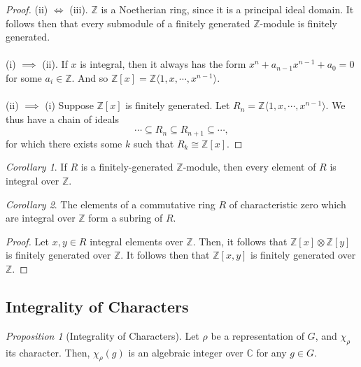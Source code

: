 \documentclass[a4paper]{report}
\theoremstyle{definition}
\theoremstyle{remark}
\theoremstyle{proposition}
\newtheorem{proposition}{Proposition}
\theoremstyle{conjecture}
\theoremstyle{lemma}
\theoremstyle{corollary}
\newtheorem{corollary}{Corollary}
\theoremstyle{exercise}
\theoremstyle{example}
\newcommand{\C}{\mathbb{C}}
\begin{document}
\begin{proof}
    (ii) $\Longleftrightarrow$ (iii). $\mathbb{Z}$ is a Noetherian ring, since
    it is a principal ideal domain.
    It follows then that every submodule of a finitely generated 
    $\mathbb{Z}$-module is finitely generated.\\\\
    (i) $\implies$ (ii). If $x$ is integral, then it always has the form
    $x^n + a_{n-1}x^{n-1} + a_0 = 0$
    for some $a_i \in \mathbb{Z}$. And so $\mathbb{Z}[x] = \mathbb{Z}\langle 1,x,\cdots,x^{n-1}\rangle$.\\\\
    (ii) $\implies$ (i) Suppose $\mathbb{Z}[x]$ is finitely generated. 
    Let $R_n = \mathbb{Z}\langle 1,x,\cdots,x^{n-1}\rangle$. 
    We thus have a chain of ideals 
    $$\cdots\subseteq R_n \subseteq R_{n+1}\subseteq \cdots,$$
    for which there exists some $k$ such that 
    $R_k \cong \mathbb{Z}[x]$.
\end{proof}

\begin{corollary}\label{cor_cor10}
    If $R$ is a finitely-generated $\mathbb{Z}$-module, then every element of 
    $R$ is integral over $\mathbb{Z}$.
\end{corollary}

\begin{corollary}
    The elements of a commutative ring $R$ of characteristic zero which 
    are integral over $\mathbb{Z}$ form a subring of $R$.
\end{corollary}

\begin{proof}
    Let $x,y\in R$ integral elements over $\mathbb{Z}$. Then, it follows
    that $\mathbb{Z}[x]\otimes \mathbb{Z}[y]$ is finitely generated over 
    $\mathbb{Z}$. It follows then that $\mathbb{Z}[x,y]$ is finitely 
    generated over $\mathbb{Z}$.
\end{proof}

\subsection{Integrality of Characters}

\begin{proposition}[Integrality of Characters]
    Let $\rho$ be a representation of $G$, and $\chi_\rho$ its character.
    Then, $\chi_\rho(g)$ is an algebraic integer over $\C$ for any $g\in G$.
\end{proposition}
\end{document}
